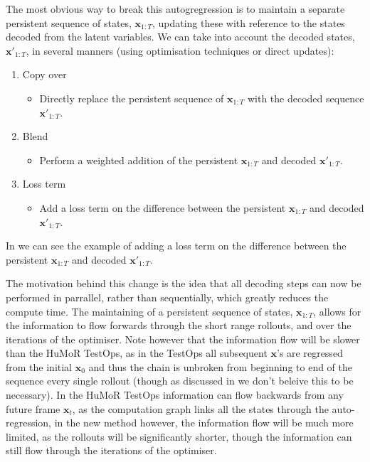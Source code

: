 The most obvious way to break this autogregression is to maintain a separate persistent sequence of states, $\mathbf{x}_{1:T}$, updating these with reference to the states decoded from the latent variables. We can take into account the decoded states, $\mathbf{x'}_{1:T}$, in several manners (using optimisation techniques or direct updates):
\begin{enumerate}
    \item Copy over
    \begin{itemize}
        \item Directly replace the persistent sequence of $\mathbf{x}_{1:T}$ with the decoded sequence $\mathbf{x'}_{1:T}$.
    \end{itemize}
    \item Blend
    \begin{itemize}
        \item Perform a weighted addition of the persistent $\mathbf{x}_{1:T}$ and decoded $\mathbf{x'}_{1:T}$.
    \end{itemize}
    \item Loss term
    \begin{itemize}
        \item Add a loss term on the difference between the persistent $\mathbf{x}_{1:T}$ and decoded $\mathbf{x'}_{1:T}$. 
    \end{itemize}
\end{enumerate}

In  we can see the example of adding a loss term on the difference between the persistent $\mathbf{x}_{1:T}$ and decoded $\mathbf{x'}_{1:T}$.

The motivation behind this change is the idea that all decoding steps can now be performed in parrallel, rather than sequentially, which greatly reduces the compute time. The maintaining of a persistent sequence of states, $\mathbf{x}_{1:T}$, allows for the information to flow forwards through the short range rollouts, and over the iterations of the optimiser. Note however that the information flow will be slower than the HuMoR TestOps, as in the TestOps all subsequent $\mathbf{x}$'s are regressed from the initial $\mathbf{x}_0$ and thus the chain is unbroken from beginning to end of the sequence every single rollout (though as discussed in  we don't beleive this to be necessary). In the HuMoR TestOps information can flow backwards from any future frame $\mathbf{x}_t$, as the computation graph links all the states through the auto-regression, in the new method however, the information flow will be much more limited, as the rollouts will be significantly shorter, though the information can still flow through the iterations of the optimiser.

